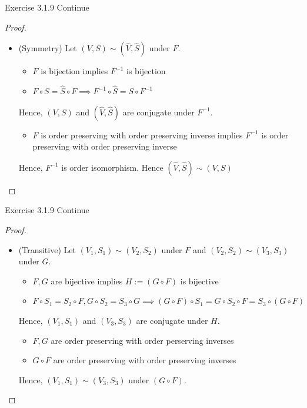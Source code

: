 \begin{frame}{Exercise 3.1.9 Continue}
\begin{proof}
        \begin{itemize}
        \item (Symmetry) Let $(V,S)\sim (\hat V,\hat S)$ under $F$. 
        \begin{itemize}
            \item $F$ is bijection implies $F^{-1}$ is bijection
            \item $F\circ S = \hat S\circ F\implies F^{-1} \circ \hat S = S\circ F^{-1}$ 
        \end{itemize}
        Hence, $(V,S)$ and $(\hat V,\hat S)$ are conjugate under $F^{-1}$.
        \begin{itemize}
            \item $F$ is order preserving with order preserving inverse implies $F^{-1}$ is order preserving with order preserving inverse
        \end{itemize}
        Hence, $F^{-1}$ is order isomorphism. Hence $(\hat V,\hat S)\sim (V,S)$
    \end{itemize}
\end{proof}
\end{frame}

\begin{frame}{Exercise 3.1.9 Continue}
\begin{proof}
    \begin{itemize}
        \item (Transitive) Let $(V_1, S_1)\sim (V_2,S_2)$ under $F$ and $(V_2,S_2)\sim (V_3, S_3)$ under $G$. 
        \begin{itemize}
            \item $F,G$ are bijective implies $H := (G\circ F)$ is bijective
            \item $F\circ S_1 = S_2\circ F, G\circ S_2 = S_3\circ G\implies  (G\circ F)\circ S_1 = G\circ S_2 \circ F = S_3\circ(G\circ F)$
        \end{itemize}
        Hence, $(V_1,S_1)$ and $(V_3,S_3)$ are conjugate under $H$.
        \begin{itemize}
            \item $F,G$ are order preserving with order perserving inverses
            \item $G\circ F$ are order preserving with order preserving inverses
        \end{itemize}
        Hence, $(V_1,S_1)\sim (V_3, S_3)$ under $(G\circ F)$.
    \end{itemize}
\end{proof}
    
\end{frame}

